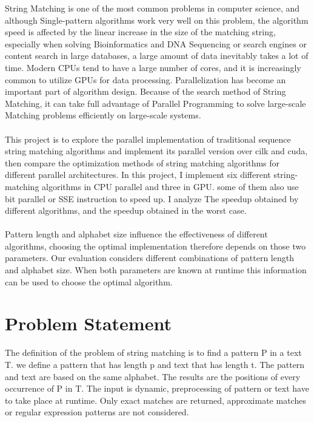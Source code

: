 \documentclass[11pt]{article}       %
\begin{document}
String Matching is one of the most common problems in computer science, and although Single-pattern algorithms work very well on this problem, the algorithm speed is affected by the linear increase in the size of the matching string, especially when solving Bioinformatics and DNA Sequencing or search engines or content search in large databases, a large amount of data inevitably takes a lot of time. Modern CPUs tend to have a large number of cores, and it is increasingly common to utilize GPUs for data processing. Parallelization has become an important part of algorithm design. Because of the search method of String Matching, it can take full advantage of Parallel Programming to solve large-scale Matching problems efficiently on large-scale systems.\\
\\This project is to explore the parallel implementation of traditional sequence string matching algorithms and implement its parallel version over cilk and cuda, then compare the optimization methods of string matching algorithms for different parallel architectures. In this project, I implement six different string-matching algorithms in CPU parallel and three in GPU. some of them also use bit parallel or SSE instruction to speed up. I analyze The speedup obtained by different algorithms, and the speedup obtained in the worst case.\\ 
\\Pattern length and alphabet size influence the effectiveness of different algorithms, choosing the optimal implementation therefore depends on those two parameters. Our evaluation considers different combinations of pattern length and alphabet size. When both parameters are known at runtime this information can be used to choose the optimal algorithm.\\





\section{Problem Statement} \label{problemStatement}


The definition of the problem of string matching is to find a pattern P  in a text T. we define a pattern that has length p and text that has length t. The pattern and text are based on the same alphabet. The results are the positions of every occurrence of P in T. The input is dynamic, preprocessing of pattern or text have to take place at runtime. Only exact matches are returned, approximate matches or regular expression patterns are not considered.
\end{document}
